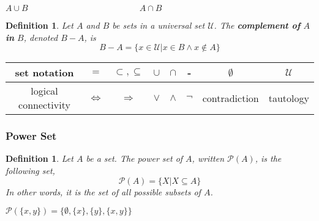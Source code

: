 \documentclass[10pt,reqno]{book}
\theoremstyle{plain}
\newtheorem{definition}[theorem]{Definition}
\def\U{\mathcal{U}}
\begin{document}
	
	\begin{center}
		$ A \cup B \qquad \qquad \qquad \qquad \qquad \qquad \quad A \cap B $ \\ \vspace*{1mm}
		\begin{venndiagram2sets}
			\fillA \fillB
		\end{venndiagram2sets} \hspace{2mm}
		\begin{venndiagram2sets}
			\fillACapB
		\end{venndiagram2sets}
	\end{center}

	\begin{definition}
		Let $ A $ and $ B $ be sets in a universal set $ \U $. The \textbf{complement of } $ A $ \textbf{in } $ B $, denoted $ B-A $, is 
		\[ B-A = \{ x \in \U | x \in B \wedge x \notin A \} \]
	\end{definition}
	
	\begin{center}
		\begin{venndiagram2sets}
			\fillOnlyB
		\end{venndiagram2sets}
	\end{center}
	
	\begin{center}
		\begin{tabular}{|c|c|c|c|c|c|c|c|}
			\hline
			    set notation     &        $ = $        & $ \subset, \subseteq $ & $ \cup $ &  $ \cap $  &    -     & $ \emptyset $ &  $ \U $   \\ \hline
			logical connectivity & $ \Leftrightarrow $ &    $ \Rightarrow $     & $ \vee $ & $ \wedge $ & $ \neg $ & contradiction & tautology \\ \hline
		\end{tabular}
	\end{center}

	\subsubsection*{Power Set}
	
	\begin{definition}
		Let $ A $ be a set. The power set of $ A $, written $ \mathcal{P}(A) $, is the following set,
		\[ \mathcal{P}(A) = \{ X | X \subseteq A \} \]
		In other words, it is the set of all possible subsets of $ A $.
	\end{definition}
	
	\noindent $ \mathcal{P}(\{x,y\}) = \{ \emptyset, \{x\}, \{y\}, \{x,y\} \} $
	
\end{document}
